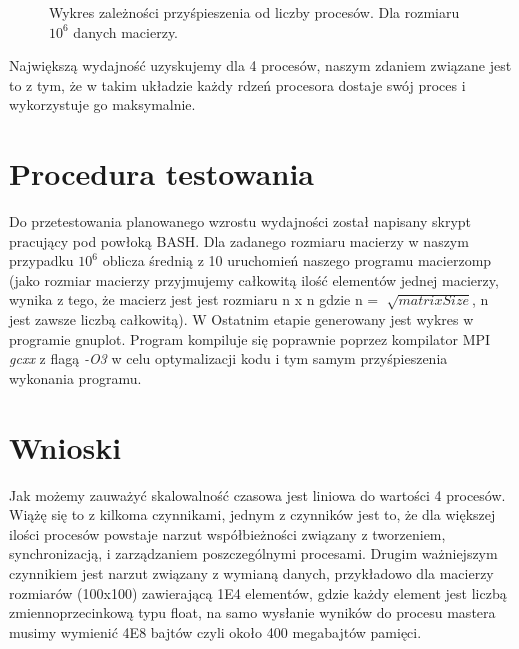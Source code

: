 \documentclass[a4paper,12pt]{article}
\begin{document}
\begin{wrapfigure}{r}{0.6\textwidth}
	\vspace{-10pt}
	\resizebox{1.0\linewidth}{!}{} 	
    \caption{Wykres zależności przyśpieszenia od liczby procesów. Dla rozmiaru $10^6$ danych macierzy.}
\end{wrapfigure}


Największą wydajność uzyskujemy dla 4 procesów, naszym zdaniem związane jest to z tym, że w takim układzie każdy rdzeń procesora dostaje swój proces i wykorzystuje go maksymalnie. \\


\section*{Procedura testowania}

Do przetestowania planowanego wzrostu wydajności został napisany skrypt pracujący pod powłoką BASH. Dla zadanego rozmiaru macierzy  w naszym przypadku $10^6$ oblicza średnią z 10 uruchomień naszego programu macierzomp (jako rozmiar macierzy przyjmujemy całkowitą ilość elementów jednej macierzy, wynika z tego, że macierz jest jest rozmiaru n x n gdzie n = $\sqrt[]{matrixSize}$, n jest zawsze liczbą całkowitą). W Ostatnim etapie generowany jest wykres w programie gnuplot. Program kompiluje się poprawnie poprzez kompilator MPI \textit{gcxx} z flagą \textit{-O3} w celu optymalizacji kodu i tym samym przyśpieszenia wykonania programu.

\section*{Wnioski}

Jak możemy zauważyć skalowalność czasowa jest liniowa do wartości 4 procesów. Wiążę się to z kilkoma czynnikami, jednym z czynników jest to, że dla większej ilości procesów powstaje narzut współbieżności związany z tworzeniem, synchronizacją, i zarządzaniem poszczególnymi procesami. Drugim ważniejszym czynnikiem jest narzut związany z wymianą danych, przykładowo dla macierzy rozmiarów (100x100) zawierającą 1E4 elementów, gdzie każdy element jest liczbą zmiennoprzecinkową typu float, na samo wysłanie wyników do procesu mastera musimy wymienić 4E8 bajtów czyli około 400 megabajtów pamięci. 
\end{document}
